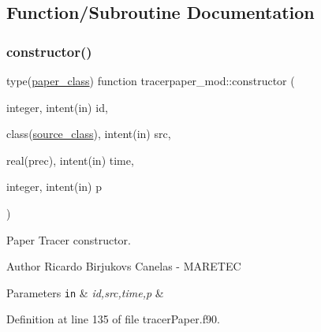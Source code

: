 \subsection{Function/\+Subroutine Documentation}
\mbox{\label{namespacetracerpaper__mod_ad1bbc9d4e889b6aab71f0333cf6a5365}} 
\subsubsection{\texorpdfstring{constructor()}{constructor()}}
{\footnotesize\ttfamily type(\mbox{\hyperlink{structtracerpaper__mod_1_1paper__class}{paper\+\_\+class}}) function tracerpaper\+\_\+mod\+::constructor (\begin{DoxyParamCaption}\item[{integer, intent(in)}]{id,  }\item[{class(\mbox{\hyperlink{structsources__mod_1_1source__class}{source\+\_\+class}}), intent(in)}]{src,  }\item[{real(prec), intent(in)}]{time,  }\item[{integer, intent(in)}]{p }\end{DoxyParamCaption})\hspace{0.3cm}{\ttfamily [private]}}



Paper Tracer constructor. 

\begin{DoxyAuthor}{Author}
Ricardo Birjukovs Canelas -\/ M\+A\+R\+E\+T\+EC 
\end{DoxyAuthor}

\begin{DoxyParams}[1]{Parameters}
\mbox{\tt in}  & {\em id,src,time,p} & \\
\hline
\end{DoxyParams}


Definition at line 135 of file tracer\+Paper.\+f90.


